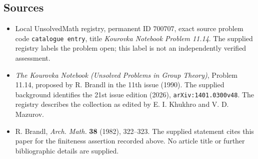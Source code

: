 \documentclass[11pt]{article}
\begin{document}
\subsection{Sources}
\begin{itemize}
\item Local UnsolvedMath registry, permanent ID \(700707\), exact source problem code \texttt{catalogue entry}, title \emph{Kourovka Notebook Problem 11.14}. The supplied registry labels the problem open; this label is not an independently verified assessment.
\item \emph{The Kourovka Notebook (Unsolved Problems in Group Theory)}, Problem 11.14, proposed by R. Brandl in the 11th issue (1990). The supplied background identifies the 21st issue edition (2026), \texttt{arXiv:1401.0300v48}. The registry describes the collection as edited by E. I. Khukhro and V. D. Mazurov.
\item R. Brandl, \emph{Arch. Math.} \textbf{38} (1982), 322--323. The supplied statement cites this paper for the finiteness assertion recorded above. No article title or further bibliographic details are supplied.
\end{itemize}
\end{document}

